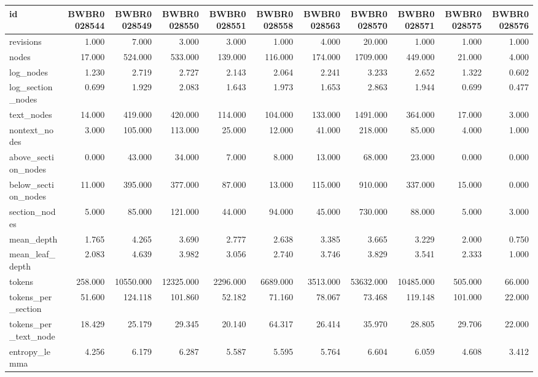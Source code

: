 \begin{tabular}{lrrrrrrrrrr}
\toprule
id & BWBR0028544 & BWBR0028549 & BWBR0028550 & BWBR0028551 & BWBR0028558 & BWBR0028563 & BWBR0028570 & BWBR0028571 & BWBR0028575 & BWBR0028576 \\
\midrule
revisions & 1.000 & 7.000 & 3.000 & 3.000 & 1.000 & 4.000 & 20.000 & 1.000 & 1.000 & 1.000 \\
\cline{1-11}
nodes & 17.000 & 524.000 & 533.000 & 139.000 & 116.000 & 174.000 & 1709.000 & 449.000 & 21.000 & 4.000 \\
\cline{1-11}
log\_nodes & 1.230 & 2.719 & 2.727 & 2.143 & 2.064 & 2.241 & 3.233 & 2.652 & 1.322 & 0.602 \\
\cline{1-11}
log\_section\_nodes & 0.699 & 1.929 & 2.083 & 1.643 & 1.973 & 1.653 & 2.863 & 1.944 & 0.699 & 0.477 \\
\cline{1-11}
text\_nodes & 14.000 & 419.000 & 420.000 & 114.000 & 104.000 & 133.000 & 1491.000 & 364.000 & 17.000 & 3.000 \\
\cline{1-11}
nontext\_nodes & 3.000 & 105.000 & 113.000 & 25.000 & 12.000 & 41.000 & 218.000 & 85.000 & 4.000 & 1.000 \\
\cline{1-11}
above\_section\_nodes & 0.000 & 43.000 & 34.000 & 7.000 & 8.000 & 13.000 & 68.000 & 23.000 & 0.000 & 0.000 \\
\cline{1-11}
below\_section\_nodes & 11.000 & 395.000 & 377.000 & 87.000 & 13.000 & 115.000 & 910.000 & 337.000 & 15.000 & 0.000 \\
\cline{1-11}
section\_nodes & 5.000 & 85.000 & 121.000 & 44.000 & 94.000 & 45.000 & 730.000 & 88.000 & 5.000 & 3.000 \\
\cline{1-11}
mean\_depth & 1.765 & 4.265 & 3.690 & 2.777 & 2.638 & 3.385 & 3.665 & 3.229 & 2.000 & 0.750 \\
\cline{1-11}
mean\_leaf\_depth & 2.083 & 4.639 & 3.982 & 3.056 & 2.740 & 3.746 & 3.829 & 3.541 & 2.333 & 1.000 \\
\cline{1-11}
tokens & 258.000 & 10550.000 & 12325.000 & 2296.000 & 6689.000 & 3513.000 & 53632.000 & 10485.000 & 505.000 & 66.000 \\
\cline{1-11}
tokens\_per\_section & 51.600 & 124.118 & 101.860 & 52.182 & 71.160 & 78.067 & 73.468 & 119.148 & 101.000 & 22.000 \\
\cline{1-11}
tokens\_per\_text\_node & 18.429 & 25.179 & 29.345 & 20.140 & 64.317 & 26.414 & 35.970 & 28.805 & 29.706 & 22.000 \\
\cline{1-11}
entropy\_lemma & 4.256 & 6.179 & 6.287 & 5.587 & 5.595 & 5.764 & 6.604 & 6.059 & 4.608 & 3.412 \\

\end{tabular}
